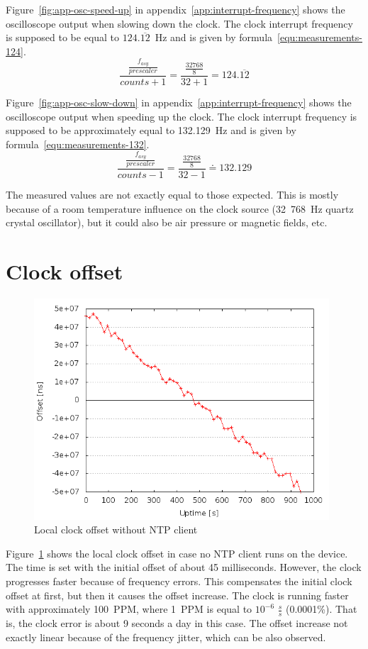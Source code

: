 Figure~\ref{fig:app-osc-speed-up} in appendix~\ref{app:interrupt-frequency} shows the oscilloscope output
when slowing down the clock.
The clock interrupt frequency
is supposed to be equal to $124.\overline{12}$~Hz and is given by formula~\ref{equ:measurements-124}.
\begin{equation}
\label{equ:measurements-124}
\frac{\frac{f_{asy}}{prescaler}}{counts + 1} = \frac{\frac{32768}{8}}{32+1} = 124.\overline{12}
\end{equation}

Figure~\ref{fig:app-osc-slow-down} in appendix~\ref{app:interrupt-frequency} shows the oscilloscope output
when speeding up the clock.
The clock interrupt frequency
is supposed to be approximately equal to 132.129~Hz and is given by formula~\ref{equ:measurements-132}.
\begin{equation}
\label{equ:measurements-132}
\frac{\frac{f_{asy}}{prescaler}}{counts - 1} = \frac{\frac{32768}{8}}{32-1} \doteq 132.129
\end{equation}

The measured values are not exactly equal to those expected.
This is mostly because of a room temperature influence on the clock source
(32~768~Hz quartz crystal oscillator),
but it could also be air pressure or magnetic fields, etc.

\section{Clock offset}
\begin{figure}[H]
  \centering
  \includegraphics[width=11cm,keepaspectratio]{fig/no-ntp.png}
  \caption{Local clock offset without NTP client}
  \label{fig:measurements-no-ntp}
\end{figure}
Figure~\ref{fig:measurements-no-ntp} shows the local clock offset
in case no NTP client runs on the device.
The time is set with the initial offset of about 45 milliseconds.
However, the clock progresses faster because of frequency errors.
This compensates the initial clock offset at first,
but then it causes the offset increase.
The clock is running faster with approximately 100~PPM,
where 1~PPM is equal to $10^{-6}$ $\frac{s}{s}$ (0.0001\%).
That is, the clock error is about 9 seconds a day in this case.
The offset increase not exactly linear because of the frequency jitter,
which can be also observed.

